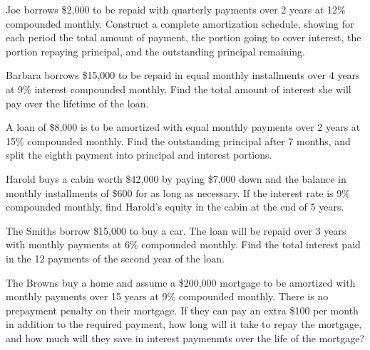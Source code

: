 \documentclass[12pt]{exam}
\begin{document}
\vspace{2in}  %

\begin{questions}

    \question Joe borrows \$2,000 to be repaid with quarterly payments over 2 years at 12\% compounded
    monthly.  Construct a complete amortization schedule, showing for each period the total amount of payment,
    the portion going to cover interest, the portion repaying principal, and the outstanding principal remaining.
    \vspace{1.5in}

    \question Barbara borrows \$15,000 to be repaid in equal monthly installments over 4 years at 9\%
    interest compounded monthly.  Find the total amount of interest she will pay over the lifetime
    of the loan.
    \vspace{1.25in}

    \question A loan of \$8,000 is to be amortized with equal monthly payments over 2 years at 15\% compounded
    monthly.  Find the outstanding principal after 7 months, and split the eighth payment into principal
    and interest portions.
    \vspace{2in}

    \question Harold buys a cabin worth \$42,000 by paying \$7,000 down and the balance in monthly installments
    of \$600 for as long as necessary.  If the interest rate is 9\% compounded monthly, find Harold's equity
    in the cabin at the end of 5 years.
    \vspace{2in}

    \question The Smiths borrow \$15,000 to buy a car.  The loan will be repaid over 3 years with monthly payments
    at 6\% compounded monthly.  Find the total interest paid in the 12 payments of the second year of the loan.
    \vspace{2in}

    \question The Browns buy a home and assume a \$200,000 mortgage to be amortized with monthly payments over
    15 years at 9\% compounded monthly.  There is no prepayment penalty on their mortgage.  If they can pay an
    extra \$100 per month in addition to the required payment, how long will it take to repay the mortgage, and
    how much will they save in interest paymenmts over the life of the mortgage?
    \vspace{1.5in}

\end{questions}
\end{document}

